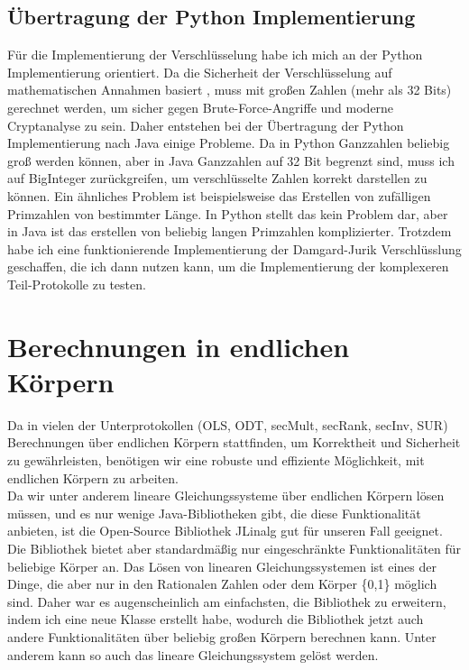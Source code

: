 \subsection{Übertragung der Python Implementierung}
Für die Implementierung der Verschlüsselung habe ich mich an der Python Implementierung \cite{swansonk14} orientiert. Da die Sicherheit der Verschlüsselung auf mathematischen Annahmen basiert  \cite{10.1007/3-540-48910-X_16}, muss mit großen Zahlen (mehr als 32 Bits) gerechnet werden, um sicher gegen Brute-Force-Angriffe und moderne Cryptanalyse zu sein. Daher entstehen bei der Übertragung der Python Implementierung nach Java einige Probleme. Da in Python Ganzzahlen beliebig groß werden können, aber in Java Ganzzahlen auf 32 Bit begrenzt sind, muss ich auf BigInteger zurückgreifen, um verschlüsselte Zahlen korrekt darstellen zu können.
Ein ähnliches Problem ist beispielsweise das Erstellen von zufälligen Primzahlen von bestimmter Länge. In Python stellt das kein Problem dar, aber in Java ist das erstellen von beliebig langen Primzahlen komplizierter. Trotzdem habe ich eine funktionierende Implementierung der Damgard-Jurik Verschlüsslung geschaffen, die ich dann nutzen kann, um die Implementierung der komplexeren Teil-Protokolle zu testen.

\section{Berechnungen in endlichen Körpern}
Da in vielen der Unterprotokollen (OLS, ODT, secMult, secRank, secInv, SUR) Berechnungen über endlichen Körpern stattfinden, um Korrektheit und Sicherheit zu gewährleisten, benötigen wir eine robuste und effiziente Möglichkeit, mit endlichen Körpern zu arbeiten.\\
Da wir unter anderem lineare Gleichungssysteme über endlichen Körpern lösen müssen, und es nur wenige Java-Bibliotheken gibt, die diese Funktionalität anbieten, ist die Open-Source Bibliothek JLinalg \cite{JLinAlg} gut für unseren Fall geeignet. Die Bibliothek bietet aber standardmäßig nur eingeschränkte Funktionalitäten für beliebige Körper an. Das Lösen von linearen Gleichungssystemen ist eines der Dinge, die aber nur in den  Rationalen Zahlen oder dem Körper \{0,1\} möglich sind. Daher war es augenscheinlich am einfachsten, die Bibliothek zu erweitern, indem ich eine neue Klasse erstellt habe, wodurch die Bibliothek jetzt auch andere Funktionalitäten über beliebig großen Körpern berechnen kann. Unter anderem kann so auch das lineare Gleichungssystem gelöst werden.\\

